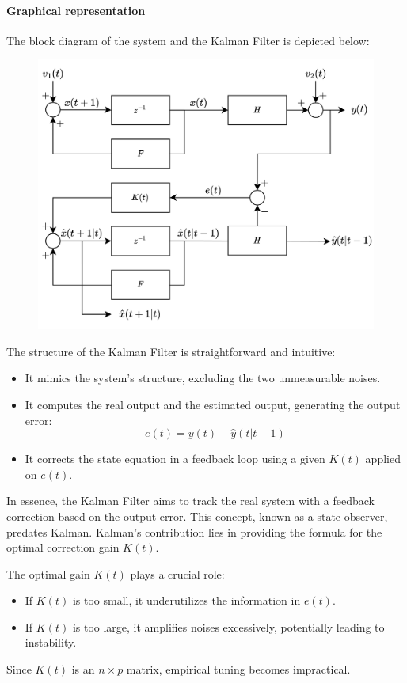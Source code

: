 \paragraph*{Graphical representation}
The block diagram of the system and the Kalman Filter is depicted below:
\begin{figure}[H]
    \centering
    \includegraphics[width=0.75\linewidth]{images/kalman.png}
\end{figure}
The structure of the Kalman Filter is straightforward and intuitive:
\begin{itemize}
    \item It mimics the system's structure, excluding the two unmeasurable noises.
    \item It computes the real output and the estimated output, generating the output error:
        \[e(t)=y(t)-\hat{y}(t|t-1)\]
    \item It corrects the state equation in a feedback loop using a given $K(t)$ applied on $e(t)$. 
\end{itemize}
In essence, the Kalman Filter aims to track the real system with a feedback correction based on the output error. 
This concept, known as a state observer, predates Kalman. 
Kalman's contribution lies in providing the formula for the optimal correction gain $K(t)$. 

The optimal gain $K(t)$ plays a crucial role:
\begin{itemize}
    \item If $K(t)$ is too small, it underutilizes the information in $e(t)$. 
    \item If $K(t)$ is too large, it amplifies noises excessively, potentially leading to instability.
\end{itemize}
Since $K(t)$ is an $n \times p$ matrix, empirical tuning becomes impractical.